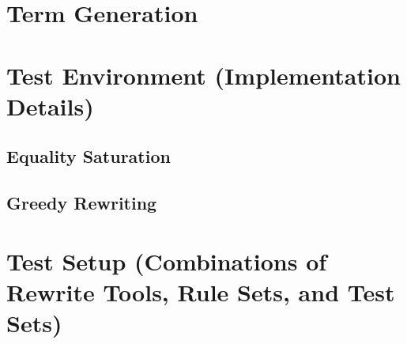 \section{Term Generation}

\section{Test Environment (Implementation Details)}

\subsection{Equality Saturation}

\subsection{Greedy Rewriting}

\section{Test Setup (Combinations of Rewrite Tools, Rule Sets, and Test Sets)}
